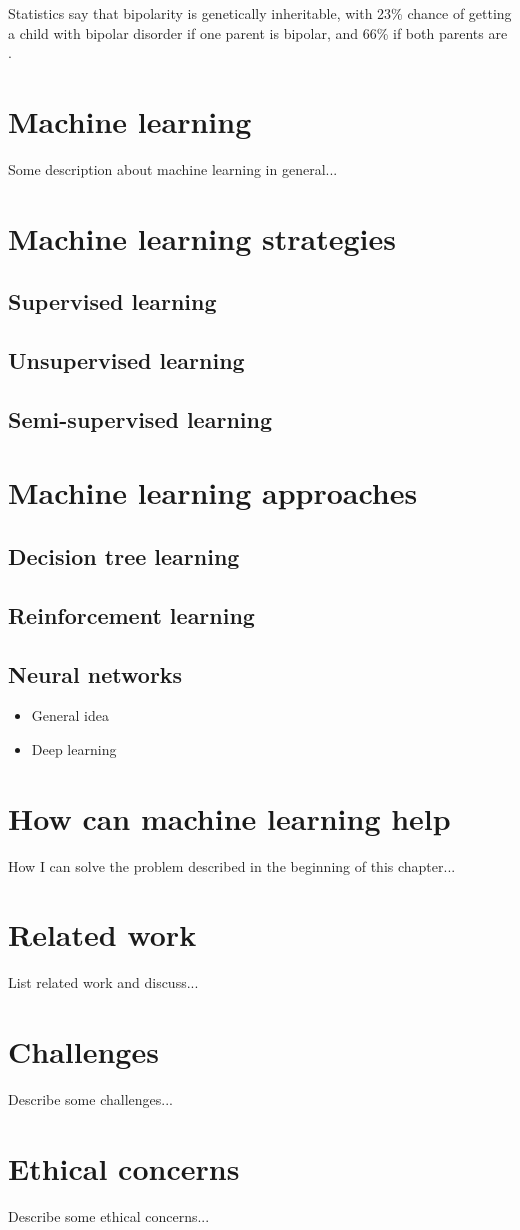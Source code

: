 Statistics say that bipolarity is genetically inheritable, with 23\% chance of getting a child with bipolar disorder if one parent is bipolar, and 66\% 
if both parents are \cite{bipolar_statistics}. 


\newpage
\section{Machine learning}  
Some description about machine learning in general...

\newpage
\section{Machine learning strategies}
\subsection{Supervised learning}
\subsection{Unsupervised learning}
\subsection{Semi-supervised learning}

\newpage
\section{Machine learning approaches}
\subsection{Decision tree learning}
\subsection{Reinforcement learning}
\subsection{Neural networks}
\begin{itemize}
    \item General idea
    \item Deep learning
\end{itemize}

\newpage
\section{How can machine learning help}
How I can solve the problem described in the beginning of this chapter...

\newpage
\section{Related work}
List related work and discuss...

\newpage
\section{Challenges}
Describe some challenges...

\newpage
\section{Ethical concerns}
Describe some ethical concerns...
